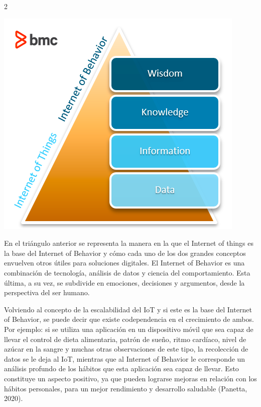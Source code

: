 \documentclass[12pt,spanish,Letterpaper,openany]{book}
\begin{document}
\begin {multicols}{2}
\begin {flushleft}
\begin{minipage}[c]{\columnwidth}
\begin{center}\includegraphics[width=0.8\linewidth]{images/mariana} \end{center}

\end{minipage}

\end {flushleft}

En el triángulo anterior se representa la manera en la que el Internet of things es la base del Internet of Behavior y cómo cada uno de los dos grandes conceptos envuelven otros útiles para soluciones digitales. El Internet of Behavior es una combinación de tecnología, análisis de datos y ciencia del comportamiento. Esta última, a su vez, se subdivide en emociones, decisiones y argumentos, desde la perspectiva del ser humano.

Volviendo al concepto de la escalabilidad del IoT y si este es la base del Internet of Behavior, se puede decir que existe codependencia en el crecimiento de ambos. Por ejemplo: si se utiliza una aplicación en un dispositivo móvil que sea capaz de llevar el control de dieta alimentaria, patrón de sueño, ritmo cardíaco, nivel de azúcar en la sangre y muchas otras observaciones de este tipo, la recolección de datos se le deja al IoT, mientras que al Internet of Behavior le corresponde un análisis profundo de los hábitos que esta aplicación sea capaz de llevar. Esto constituye un aspecto positivo, ya que pueden lograrse mejoras en relación con los hábitos personales, para un mejor rendimiento y desarrollo saludable (Panetta, 2020).


\end{multicols}
\end{document}
